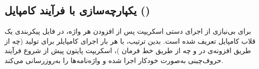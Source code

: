 \subsection{یکپارچه‌سازی با فرآیند کامپایل ()}

برای بی‌نیازی از اجرای دستی اسکریپت پس از افزودن هر واژه، در فایل پیکربندی  یک قلاب کامپایل تعریف شده است. بدین ترتیب، با هر بار اجرای کامپایلر برای تولید  (چه از طریق افزونه‌ی  در  و چه از طریق خط فرمان )، اسکریپت پایتون پیش از شروع فرآیند حروف‌چینی به‌صورت خودکار اجرا شده و واژه‌نامه‌ها را به‌روزرسانی می‌کند.
